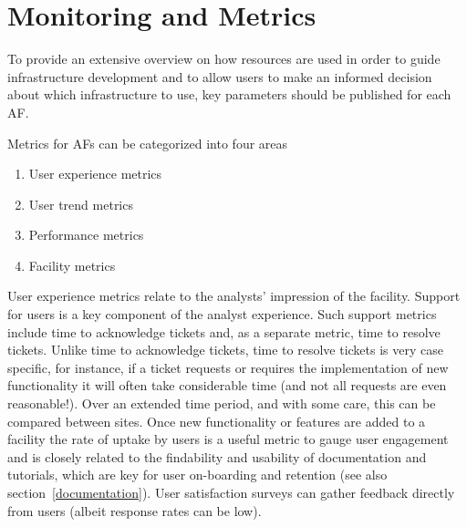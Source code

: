 \section{Monitoring and Metrics}
\label{monitoring}

To provide an extensive overview on how resources are used in order to guide infrastructure development and to allow users to make an informed decision about which infrastructure to use, key parameters should be published for each AF.

Metrics for AFs can be categorized into four areas

\begin{enumerate}
    \item User experience metrics
    \item User trend metrics
    \item Performance metrics
    \item Facility metrics
\end{enumerate}

User experience metrics relate to the analysts’ impression of the facility. Support for users is a key component of the analyst experience. Such support metrics include time to acknowledge tickets and, as a separate metric, time to resolve tickets. Unlike time to acknowledge tickets, time to resolve tickets is very case specific, for instance, if a ticket requests or requires the implementation of new functionality it will often take considerable time (and not all requests are even reasonable!). Over an extended time period, and with some care, this can be compared between sites. Once new functionality or features are added to a facility the rate of uptake by users is a useful metric to gauge user engagement and is closely related to the findability and usability of documentation and tutorials, which are key for user on-boarding and retention (see also section~\ref{documentation}). User satisfaction surveys can gather feedback directly from users (albeit response rates can be low). 

